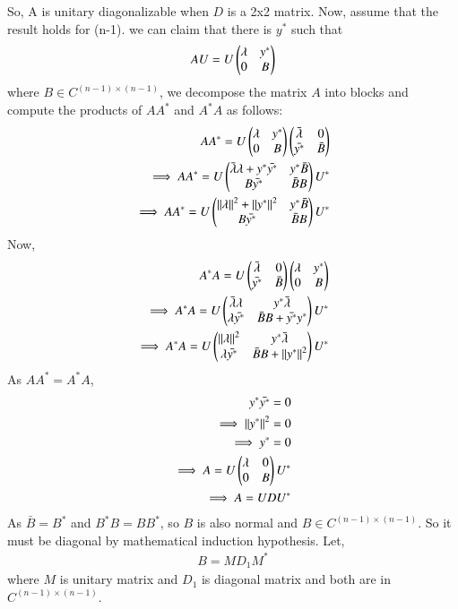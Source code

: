 \documentclass[journal,12pt,twocolumn]{IEEEtran}
\begin{document}
So, A is unitary diagonalizable when $D$ is a 2x2 matrix.
Now, assume that the result holds for (n-1). we can claim that there is $y^*$ such that 
\begin{align}
AU = U\begin{pmatrix}\lambda & y^*\\0 & B\end{pmatrix}
\end{align}
where $B \in C^{(n-1)\times(n-1)}$, we decompose the matrix $A$ into blocks and compute the products of $A A^*$ and $A^* A$ as follows:
\begin{align}
A A^* =  U \begin{pmatrix}\lambda & y^*\\0 & B\end{pmatrix}\begin{pmatrix}\bar{\lambda} & 0\\\bar{y^*} & \bar{B}\end{pmatrix}\\
\implies A A^* =  U \begin{pmatrix}\bar{\lambda}\lambda + y^*\bar{y^*} & y^* \bar{B}\\B\bar{y^*} & \bar{B}B\end{pmatrix} U^*\\
\implies A A^* = U \begin{pmatrix}\left\lVert\lambda\right\rVert^2 + \left\lVert y^*\right\rVert^2 & y^* \bar{B}\\B\bar{y^*} & \bar{B}B\end{pmatrix} U^*
\end{align}
Now,
\begin{align}
A^* A = U \begin{pmatrix}\bar{\lambda} & 0\\\bar{y^*} & \bar{B}\end{pmatrix}\begin{pmatrix}\lambda & y^*\\0 & B\end{pmatrix}\\
\implies A^* A =  U \begin{pmatrix}\bar{\lambda}\lambda & y^* \bar{\lambda}\\\lambda\bar{y^*} & \bar{B}B + \bar{y^*}y^*\end{pmatrix} U^*\\
\implies A^* A =U \begin{pmatrix}\left\lVert\lambda\right\rVert^2 & y^* \bar{\lambda}\\\lambda\bar{y^*} & \bar{B}B + \left\lVert y^*\right\rVert^2\end{pmatrix} U^*
\end{align}
As $A A^* = A^* A$, 
\begin{align}
y^* \bar{y^*} = 0\\
\implies \left\lVert y^*\right\rVert^2 = 0\\
\implies y^* =0\\
\implies A = U \begin{pmatrix}\lambda & 0\\0 & B\end{pmatrix} U^*\\
\implies A = U D U^*
\end{align}
As $\bar{B} = B^*$ and $B^* B = B B^*$, so $B$ is also normal and $B \in C^{(n-1)\times(n-1)}$. So it must be diagonal by mathematical induction hypothesis.
Let, 
\begin{align}
B = M D_1 M^*
\end{align}
where $M$ is unitary matrix and $D_1$ is diagonal matrix and both are in $C^{(n-1)\times(n-1)}$.
\end{document}
